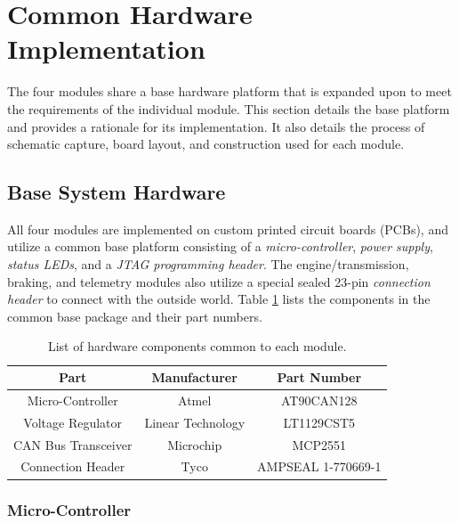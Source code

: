 \section{Common Hardware Implementation\label{sec:common_hardware_implementation}}

The four modules share a base hardware platform that is expanded upon to meet the requirements of the individual module. This section details the base platform and provides a rationale for its implementation. It also details the process of schematic capture, board layout, and construction used for each module.


\subsection{Base System Hardware\label{sec:base_system_hardware}}

All four modules are implemented on custom printed circuit boards (PCBs), and utilize a common base platform consisting of a \emph{micro-controller}, \emph{power supply}, \emph{status LEDs}, and a \emph{JTAG programming header}. The engine/transmission, braking, and telemetry modules also utilize a special sealed 23-pin \emph{connection header} to connect with the outside world. Table \ref{tab:common_module_components} lists the components in the common base package and their part numbers.

\begin{table}[H]
	\caption{List of hardware components common to each module.}
	\label{tab:common_module_components}
	\centering
	\begin{tabular}{|c|c|c|}
		\hline 
		Part & Manufacturer & Part Number \\ 
		\hline \hline
		Micro-Controller & Atmel & AT90CAN128 \\
		\hline
		Voltage Regulator & Linear Technology & LT1129CST5 \\
		\hline
		CAN Bus Transceiver & Microchip & MCP2551 \\
		\hline
		Connection Header & Tyco & AMPSEAL 1-770669-1 \\
		\hline
	\end{tabular}
\end{table}

\subsubsection{Micro-Controller}

